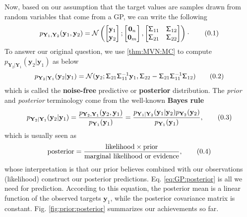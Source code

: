 \documentclass[10pt]{article}
\theoremstyle{definition}
\newcommand\eqnum{\addtocounter{equation}{1}\tag{\arabic{section}.\arabic{equation}}}
\begin{document}
Now, based on our assumption that the target values are samples drawn from random variables that come from a GP, we can write the following
\begin{equation*}
p_{\mathbf{Y}_{1}, \mathbf{Y}_{2}}(\mathbf{y}_{1}, \mathbf{y}_{2}) =
\mathcal{N} \left(
\begin{bmatrix}
\mathbf{y}_1 \\
\mathbf{y}_2
\end{bmatrix} ;
\begin{bmatrix}
\mathbf{0}_n \\
\mathbf{0}_m
\end{bmatrix} ,
\begin{bmatrix}
\mathsf{\Sigma}_{11} & \mathsf{\Sigma}_{12} \\
\mathsf{\Sigma}_{21} & \mathsf{\Sigma}_{22} 
\end{bmatrix}
\right) \cdot
\eqnum
\label{eq:GP:joint}
\end{equation*}
To answer our original question, we use \cref{thm:MVN:MC} to compute $p_{\mathbf{Y}_2|\mathbf{Y}_1}(\mathbf{y}_2|\mathbf{y}_1)$ as below
\begin{equation*}
p_{\mathbf{Y}_2|\mathbf{Y}_1}(\mathbf{y}_2|\mathbf{y}_1) = 
\mathcal{N}(\mathbf{y}_2;\mathsf{\Sigma}_{21}\mathsf{\Sigma}_{11}^{-1}\mathbf{y}_1, \mathsf{\Sigma}_{22} - 
\mathsf{\Sigma}_{21} \mathsf{\Sigma}_{11}^{-1} \mathsf{\Sigma}_{12})
\eqnum
\label{eq:GP:posterior}
\end{equation*}
which is called the \textbf{noise-free} predictive or \textbf{posterior} distribution.  The \textit{prior} and \textit{posterior} terminology come from the well-known \textbf{Bayes rule}
\begin{equation*}
p_{\mathbf{Y}_2|\mathbf{Y}_1}(\mathbf{y}_2|\mathbf{y}_1) =
\frac{p_{\mathbf{Y}_2,\mathbf{Y}_1}(\mathbf{y}_2,\mathbf{y}_1)}{p_{\mathbf{Y}_1}(\mathbf{y}_1)} = 
\frac{p_{\mathbf{Y}_1|\mathbf{Y}_2}(\mathbf{y}_1|\mathbf{y}_2)p_{\mathbf{Y}_2}(\mathbf{y}_2)}{p_{\mathbf{Y}_1}(\mathbf{y}_1)},
\eqnum
\end{equation*}
which is usually seen as
\begin{equation*}
\text{posterior} = \frac{\text{likelihood} \times \text{prior}}{\text{marginal likelihood or evidence}},
\eqnum
\end{equation*}
whose interpretation is that our prior believes combined with our observations (likelihood) construct our posterior predictions. Eq. \eqref{eq:GP:posterior} is all we need for prediction. According to this equation, the posterior mean is a linear function of the observed targets $\mathbf{y}_1$, while the posterior covariance matrix is constant. Fig. \ref{fig:prior:posterior} summarizes our achievements so far.
\end{document}
